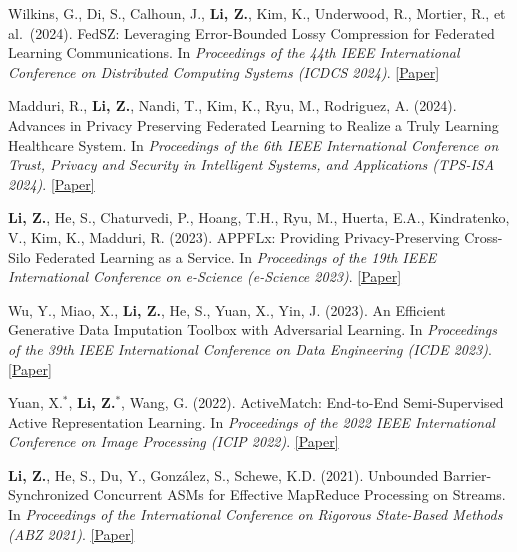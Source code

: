 \documentclass[letterpaper,11pt]{article}
\begin{document}
\begin{enumerate}[leftmargin=1cm, label={[\arabic*]}, itemsep=3pt]
  \item Wilkins, G., Di, S., Calhoun, J., \textbf{Li, Z.}, Kim, K., Underwood, R., Mortier, R., et al.\ (2024). FedSZ: Leveraging Error-Bounded Lossy Compression for Federated Learning Communications. In \textit{Proceedings of the 44th IEEE International Conference on Distributed Computing Systems (ICDCS 2024)}. \href{https://arxiv.org/abs/2312.13461}{[Paper]}

  \item Madduri, R., \textbf{Li, Z.}, Nandi, T., Kim, K., Ryu, M., Rodriguez, A. (2024). Advances in Privacy Preserving Federated Learning to Realize a Truly Learning Healthcare System. In \textit{Proceedings of the 6th IEEE International Conference on Trust, Privacy and Security in Intelligent Systems, and Applications (TPS-ISA 2024)}. \href{https://arxiv.org/abs/2409.19756}{[Paper]}

  \item \textbf{Li, Z.}, He, S., Chaturvedi, P., Hoang, T.H., Ryu, M., Huerta, E.A., Kindratenko, V., Kim, K., Madduri, R. (2023). APPFLx: Providing Privacy-Preserving Cross-Silo Federated Learning as a Service. In \textit{Proceedings of the 19th IEEE International Conference on e-Science (e-Science 2023)}. \href{https://arxiv.org/abs/2308.08786}{[Paper]}

  \item Wu, Y., Miao, X., \textbf{Li, Z.}, He, S., Yuan, X., Yin, J. (2023). An Efficient Generative Data Imputation Toolbox with Adversarial Learning. In \textit{Proceedings of the 39th IEEE International Conference on Data Engineering (ICDE 2023)}. \href{https://ieeexplore.ieee.org/abstract/document/10184711}{[Paper]}

  \item Yuan, X.$^*$, \textbf{Li, Z.$^*$}, Wang, G. (2022). ActiveMatch: End-to-End Semi-Supervised Active Representation Learning. In \textit{Proceedings of the 2022 IEEE International Conference on Image Processing (ICIP 2022)}. \href{https://arxiv.org/abs/2110.02521}{[Paper]}

  \item \textbf{Li, Z.}, He, S., Du, Y., Gonz\'{a}lez, S., Schewe, K.D. (2021). Unbounded Barrier-Synchronized Concurrent ASMs for Effective MapReduce Processing on Streams. In \textit{Proceedings of the International Conference on Rigorous State-Based Methods (ABZ 2021)}. \href{https://doi.org/10.1007/978-3-030-77543-8_1}{[Paper]}
\end{enumerate}
\end{document}
